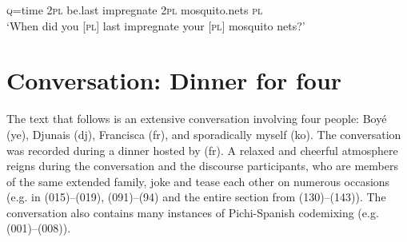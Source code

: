{\textsc{q}=time  \textsc{2pl}  be.last  impregnate  \textsc{2pl}     mosquito.nets  \textsc{pl}    \\
\glt
‘When did you [\textsc{pl}] last impregnate your [\textsc{pl}] mosquito nets?’
  }\z

\section{Conversation: Dinner for four}

The text that follows is an extensive conversation involving four people: Boyé (ye), Djunais (dj), Francisca (fr), and sporadically myself (ko). The conversation was recorded during a dinner hosted by (fr). A relaxed and cheerful atmosphere reigns during the conversation and the discourse participants, who are members of the same extended family, joke and tease each other on numerous occasions (e.g. in (015)–(019), (091)–(94) and the entire section from (130)–(143)). The conversation also contains many instances of Pichi-Spanish codemixing (e.g. (001)–(008)).


